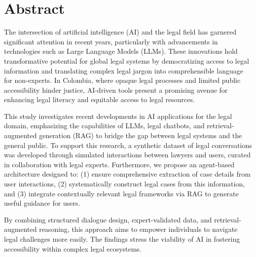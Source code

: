 
\chapter{Abstract}
The intersection of artificial intelligence (AI) and 
the legal field has garnered significant attention in 
recent years, particularly with advancements in technologies 
such as Large Language Models (LLMs). 
These innovations hold transformative potential for 
global legal systems by democratizing access to legal 
information and translating complex legal jargon into 
comprehensible language for non-experts. 
In Colombia, where opaque legal processes and 
limited public accessibility hinder justice, 
AI-driven tools present a promising avenue for enhancing 
legal literacy and equitable access to legal resources.

This study investigates recent developments in AI applications 
for the legal domain, emphasizing the capabilities of LLMs, 
legal chatbots, and retrieval-augmented generation (RAG) 
to bridge the gap between legal systems and the general public. 
To support this research, a synthetic dataset of legal conversations 
was developed through simulated interactions between lawyers and users, 
curated in collaboration with legal experts. 
Furthermore, we propose an agent-based architecture designed to: 
(1) ensure comprehensive extraction of case details from user interactions, 
(2) systematically construct legal cases from this information, 
and (3) integrate contextually relevant legal frameworks via RAG to 
generate useful guidance for users.

By combining structured dialogue design, expert-validated data, 
and retrieval-augmented reasoning, this approach aims to empower 
individuals to navigate legal challenges more easily. The findings stress the 
viability of AI in fostering accessibility within complex legal ecosystems. 
\endinput

